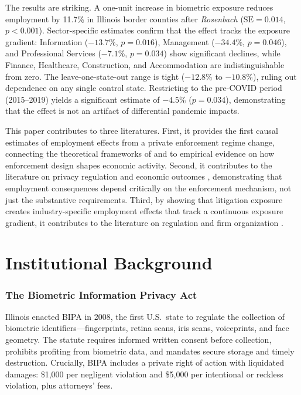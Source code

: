 \documentclass[12pt]{article}
\begin{document}
The results are striking. A one-unit increase in biometric exposure reduces employment by 11.7\% in Illinois border counties after \textit{Rosenbach} ($\text{SE} = 0.014$, $p < 0.001$). Sector-specific estimates confirm that the effect tracks the exposure gradient: Information ($-13.7\%$, $p = 0.016$), Management ($-34.4\%$, $p = 0.046$), and Professional Services ($-7.1\%$, $p = 0.034$) show significant declines, while Finance, Healthcare, Construction, and Accommodation are indistinguishable from zero. The leave-one-state-out range is tight ($-12.8\%$ to $-10.8\%$), ruling out dependence on any single control state. Restricting to the pre-COVID period (2015--2019) yields a significant estimate of $-4.5\%$ ($p = 0.034$), demonstrating that the effect is not an artifact of differential pandemic impacts.

This paper contributes to three literatures. First, it provides the first causal estimates of employment effects from a private enforcement regime change, connecting the theoretical frameworks of \citet{shavell1984} and \citet{beckerstigler1974} to empirical evidence on how enforcement design shapes economic activity. Second, it contributes to the literature on privacy regulation and economic outcomes \citep{millertuck2009, acquisti2016}, demonstrating that employment consequences depend critically on the enforcement mechanism, not just the substantive requirements. Third, by showing that litigation exposure creates industry-specific employment effects that track a continuous exposure gradient, it contributes to the literature on regulation and firm organization \citep{garicano2016, holmes1998, suarezserratozidar2016}.

\section{Institutional Background}
\label{sec:background}

\subsubsection*{The Biometric Information Privacy Act} Illinois enacted BIPA in 2008, the first U.S.\ state to regulate the collection of biometric identifiers---fingerprints, retina scans, iris scans, voiceprints, and face geometry. The statute requires informed written consent before collection, prohibits profiting from biometric data, and mandates secure storage and timely destruction. Crucially, BIPA includes a private right of action with liquidated damages: \$1,000 per negligent violation and \$5,000 per intentional or reckless violation, plus attorneys' fees.
\end{document}
